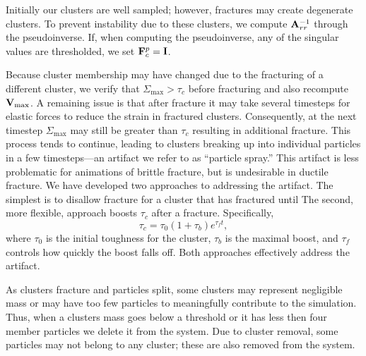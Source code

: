 \documentclass[conference]{acmsiggraph}
\begin{document}
Initially our clusters are well sampled; however, fractures may create degenerate clusters.  To prevent instability due to these clusters, we compute $\mathit{\mathbf{A}}_{rr}^{-1}$
through the pseudoinverse.  If, when computing the pseudoinverse, any of the singular values are thresholded,
we set $\mathit{\mathbf{F}}_c^p = \mathit{\mathbf{I}}$.  


Because cluster membership may have changed due to the fracturing of a different cluster, we verify that 
$\Sigma_{\max} > \tau_c$ before fracturing and also recompute $\mathit{\mathbf{V}}_{\max}$.  A remaining issue is that
after fracture it may take several timesteps for elastic forces to reduce the strain in fractured
clusters.  Consequently, at the next timestep $\Sigma_{\max}$ may still be greater than $\tau_c$ resulting
in additional fracture.  This process tends to continue, leading to clusters breaking up into individual particles
in a few timesteps---an artifact we refer to as ``particle
spray.''  This artifact is less problematic for animations of brittle fracture, but is undesirable in ductile
fracture.  We have developed two approaches to addressing the artifact.  The simplest is to
disallow fracture for a cluster that has fractured until   The second, more flexible,
approach boosts $\tau_c$ after a fracture.  Specifically,
\begin{equation}
\tau_c = \tau_0 (1+\tau_b)e^{\tau_ft},
\end{equation}
where $\tau_0$ is the initial toughness for the cluster, $\tau_b$ is the maximal boost, and $\tau_f$ controls
how quickly the boost falls off.  Both approaches effectively address the artifact.

As clusters fracture and particles split, some clusters may represent negligible mass or may have too
few particles to meaningfully contribute to the simulation.  Thus, when a clusters mass goes below
a threshold or it has less then four member particles we delete it from the system.  Due to cluster
removal, some particles may not belong to any cluster; these are also removed from the system.
\end{document}
